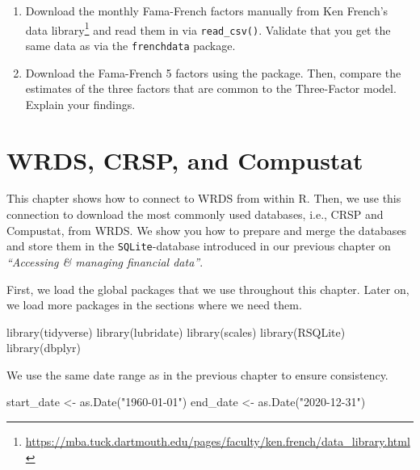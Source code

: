 \documentclass[
]{book}
\newenvironment{Shaded}{\begin{snugshade}}{\end{snugshade}}
\newcommand{\FunctionTok}[1]{\textcolor[rgb]{0,0,0}{#1}}
\newcommand{\NormalTok}[1]{#1}
\newcommand{\OtherTok}[1]{\textcolor[rgb]{0.37,0.37,0.37}{#1}}
\newcommand{\StringTok}[1]{\textcolor[rgb]{0.5,0.5,0.5}{#1}}
\providecommand{\tightlist}{%
  \setlength{\itemsep}{0pt}\setlength{\parskip}{0pt}}
\renewcommand{\href}[2]{#2\footnote{\url{#1}}}
\begin{document}
\begin{enumerate}
\def\labelenumi{\arabic{enumi}.}
\tightlist
\item
  Download the monthly Fama-French factors manually from \href{https://mba.tuck.dartmouth.edu/pages/faculty/ken.french/data_library.html}{Ken French's data library} and read them in via \texttt{read\_csv()}. Validate that you get the same data as via the \texttt{frenchdata} package.
\item
  Download the Fama-French 5 factors using the package. Then, compare the estimates of the three factors that are common to the Three-Factor model. Explain your findings.
\end{enumerate}

\hypertarget{wrds-crsp-and-compustat}{%
\chapter{WRDS, CRSP, and Compustat}\label{wrds-crsp-and-compustat}}

This chapter shows how to connect to WRDS from within R. Then, we use this connection to download the most commonly used databases, i.e., CRSP and Compustat, from WRDS. We show you how to prepare and merge the databases and store them in the \texttt{SQLite}-database introduced in our previous chapter on \emph{``Accessing \& managing financial data''}.

First, we load the global packages that we use throughout this chapter. Later on, we load more packages in the sections where we need them.

\begin{Shaded}
\begin{Highlighting}[]
\FunctionTok{library}\NormalTok{(tidyverse)}
\FunctionTok{library}\NormalTok{(lubridate)}
\FunctionTok{library}\NormalTok{(scales)}
\FunctionTok{library}\NormalTok{(RSQLite)}
\FunctionTok{library}\NormalTok{(dbplyr)}
\end{Highlighting}
\end{Shaded}

We use the same date range as in the previous chapter to ensure consistency.

\begin{Shaded}
\begin{Highlighting}[]
\NormalTok{start\_date }\OtherTok{\textless{}{-}} \FunctionTok{as.Date}\NormalTok{(}\StringTok{"1960{-}01{-}01"}\NormalTok{)}
\NormalTok{end\_date }\OtherTok{\textless{}{-}} \FunctionTok{as.Date}\NormalTok{(}\StringTok{"2020{-}12{-}31"}\NormalTok{)}
\end{Highlighting}
\end{Shaded}
\end{document}
